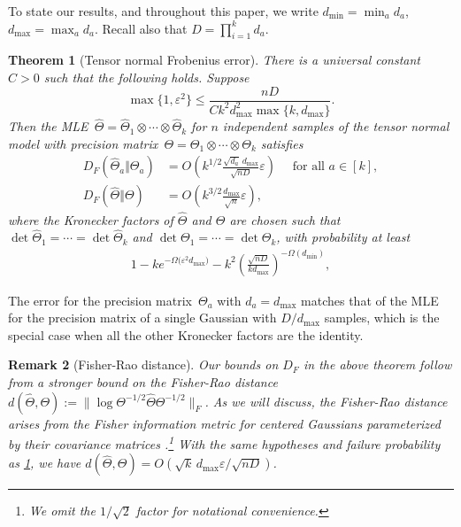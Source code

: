 \documentclass[aos]{imsart}
\newtheorem{theorem}{Theorem}[section]
\newtheorem{remark}[theorem]{Remark}
\theoremstyle{definition}
\numberwithin{equation}{section}
\newcommand{\htheta}{\widehat{\Theta}}
\newcommand{\ot}{\otimes}
\newcommand{\eps}{\varepsilon}
\def\dmax{d_{\max}}
\begin{document}
To state our results, and throughout this paper, we write $d_{\min} = \min_a d_a$, $\dmax = \max_a d_a$.
Recall also that $D = \prod_{i=1}^k d_a$. \newcommand{\TensorFrob}[2]{%
There is a universal constant~$C>0$ such that the following holds.
Suppose
\begin{#1}#2
  \max\{1 , \eps^2\} \leq \frac{nD}{C k^2 \dmax^2 \max\{k, \dmax\}}.
\end{#1}
Then the MLE~$\htheta = \htheta_1 \ot \cdots \ot \htheta_k$ for $n$ independent samples of the tensor normal model with precision matrix~$\Theta = \Theta_1 \ot \cdots \ot \Theta_k$ satisfies
\begin{align*}
  D_F(\htheta_a\Vert\Theta_a) &= O\left(k^{1/2} \frac{\sqrt{d_a} \, \dmax}{\sqrt{n D}} \eps\right) \quad\text{ for all } a\in[k], \\
  D_F(\htheta\Vert\Theta) &= O\left(k^{3/2} \frac{\dmax}{\sqrt{n}} \eps\right),
\end{align*}
where the Kronecker factors of $\htheta$ and $\Theta$ are chosen such that $\det\htheta_1 = \cdots = \det\htheta_k$ and $\det\Theta_1 = \cdots = \det\Theta_k$, with probability at least
\begin{align*}
  1 - k e^{-\Omega\bigl( \eps^2 \dmax \bigr)} - k^2 \left( \frac{\sqrt{nD}}{k \dmax} \right)^{-\Omega(d_{\min})},
\end{align*}}

\begin{theorem}[Tensor normal Frobenius error]\label{thm:tensor-frobenius}
\TensorFrob{equation}{\label{eq:eps sqr assm}}
\end{theorem}

The error for the precision matrix~$\Theta_a$ with $d_a = \dmax$ matches that of the MLE for the precision matrix of a single Gaussian with $D/\dmax$ samples, which is the special case when all the other Kronecker factors are the identity. 
\begin{remark}[Fisher-Rao distance] Our bounds on $D_F$ in the above theorem follow from a stronger bound on the \emph{Fisher-Rao distance} $d(\htheta, \Theta):= \| \log \Theta^{-1/2} \htheta \Theta^{-1/2}\|_F$. As we will discuss, the Fisher-Rao distance arises from the Fisher information metric for centered Gaussians parameterized by their covariance matrices \citep{skovgaard1984riemannian}.\footnote{We omit the $1/\sqrt{2}$ factor for notational convenience.} With the same hypotheses and failure probability as \cref{thm:tensor-frobenius}, we have $d(\htheta, \Theta)  = O(\sqrt{k} \, \dmax \eps/\sqrt{nD})$.

\end{remark}
\end{document}
